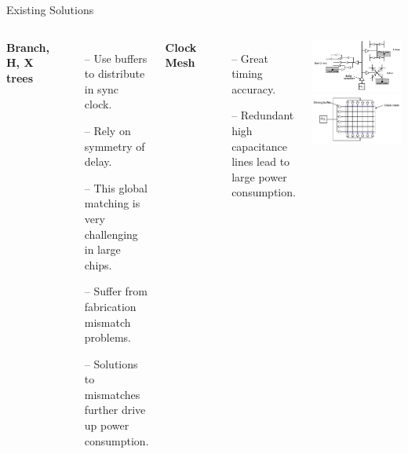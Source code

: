 \documentclass{beamer}
\begin{document}
\begin{frame}{Existing Solutions}
	\begin{columns}
		\textbf{Branch, H, X trees}
		\begin{itemize}
			\item[--]
				Use buffers to distribute in sync clock.
			\item[--]
				Rely on symmetry of delay.
			\item[--]
				This global matching is very challenging in large chips.
			\item[--]
				Suffer from fabrication mismatch problems.	
			\item[--]
				Solutions to mismatches further drive up power consumption.
		\end{itemize}
		\textbf{Clock Mesh}
		\begin{itemize}
			\item[--]
				Great timing accuracy.
			\item[--]
				Redundant high capacitance lines lead to large power consumption.
		\end{itemize}
			\includegraphics[scale=0.4]{eldar_trees}
			\includegraphics[scale=0.4]{eldar_mesh}
	\end{columns}
 
\end{frame}
\end{document}

